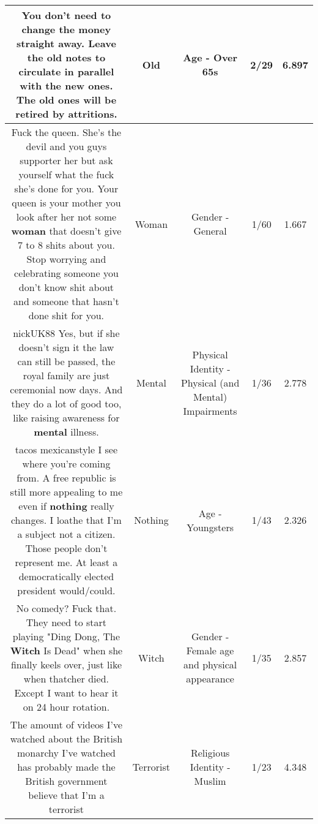 \documentclass[11pt]{article}
\newlength\mylength
\begin{document}
\begin{center}
\begin{longtable}{|C{.65\mylength}|C{.30\mylength}|C{.12\mylength}|C{.12\mylength}|C{.12\mylength}|}
  \small You don't need to change the money straight away. Leave the \textbf{old} notes to circulate in parallel with the new ones. The \textbf{old} ones will be retired by attritions.\normalsize   & Old & Age - Over 65s & 2/29 & 6.897 \\  \hline
  \small Fuck the queen. She's the devil and you guys supporter her but ask yourself what the fuck she's done for you. Your queen is your mother you look after her not some \textbf{woman} that doesn't give 7 to 8 shits about you. Stop worrying and celebrating someone you don't know shit about and someone that hasn't done shit for you.\normalsize   & Woman & Gender - General & 1/60 & 1.667 \\  \hline
  \small nickUK88 Yes, but if she doesn't sign it the law can still be passed, the royal family are just ceremonial now days. And they do a lot of good too, like raising awareness for \textbf{mental} illness.\normalsize   & Mental & Physical Identity - Physical (and Mental) Impairments & 1/36 & 2.778 \\  \hline
  \small tacos mexicanstyle I see where you're coming from. A free republic is still more appealing to me even if \textbf{nothing} really changes. I loathe that I'm a subject not a citizen. Those people don't represent me. At least a democratically elected president would/could.\normalsize   & Nothing & Age - Youngsters & 1/43 & 2.326 \\  \hline
  \small No comedy?  Fuck that.  They need to start playing "Ding Dong, The \textbf{Witch} Is Dead" when she finally keels over, just like when thatcher died.    Except I want to hear it on 24 hour rotation.\normalsize   & Witch & Gender - Female age and physical appearance & 1/35 & 2.857 \\  \hline
  \small The amount of videos I've watched about the British monarchy I've watched has probably made the British government believe that I'm a terrorist\normalsize   & Terrorist & Religious Identity - Muslim & 1/23 & 4.348 \\  \hline

\end{longtable}
\end{center}
\end{document}
